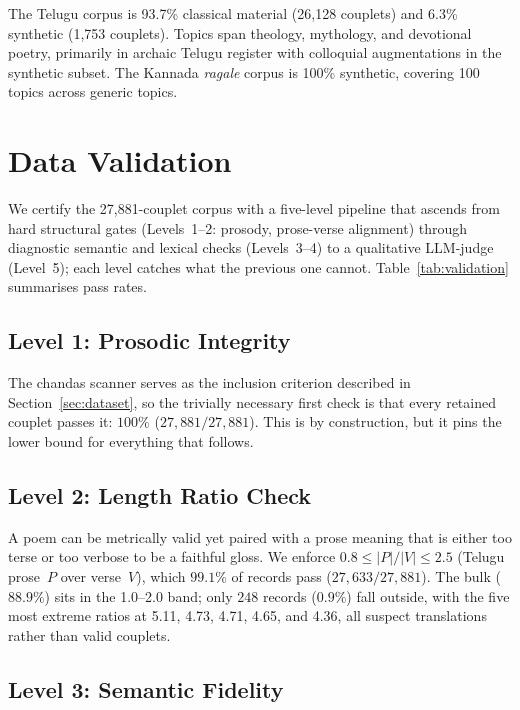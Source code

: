 \documentclass[11pt]{article}
\begin{document}
The Telugu corpus is 93.7\% classical material (26,128 couplets) and 6.3\% synthetic
(1,753 couplets). Topics span theology, mythology, and devotional poetry,
primarily in archaic Telugu register with colloquial augmentations in the
synthetic subset. The Kannada \textit{ragale} corpus is 100\% synthetic, covering 100 topics across generic topics.
\section{Data Validation}
\label{sec:validation}

We certify the 27,881-couplet corpus with a five-level pipeline that
ascends from hard structural gates (Levels~1--2: prosody, prose-verse
alignment) through diagnostic semantic and lexical checks
(Levels~3--4) to a qualitative LLM-judge (Level~5); each level catches
what the previous one cannot. Table~\ref{tab:validation} summarises
pass rates.

\subsection{Level 1: Prosodic Integrity}

The chandas scanner serves as the inclusion criterion described in
Section~\ref{sec:dataset}, so the trivially necessary first check is
that every retained couplet passes it: $100\%$ ($27{,}881/27{,}881$).
This is by construction, but it pins the lower bound for everything
that follows.

\subsection{Level 2: Length Ratio Check}

A poem can be metrically valid yet paired with a prose meaning that is
either too terse or too verbose to be a faithful gloss. We enforce
$0.8 \leq |P|/|V| \leq 2.5$ (Telugu prose~$P$ over verse~$V$),
which $99.1\%$ of records pass ($27{,}633/27{,}881$). The bulk
($88.9\%$) sits in the 1.0--2.0 band; only $248$ records ($0.9\%$)
fall outside, with the five most extreme ratios at 5.11, 4.73, 4.71,
4.65, and 4.36, all suspect translations rather than valid couplets.

\subsection{Level 3: Semantic Fidelity}
\end{document}
